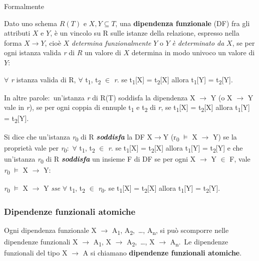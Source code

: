 \begin{center}
	Formalmente
\end{center}

\noindent Dato uno schema $R(T)$ e $X, Y \subseteq T$, una \textbf{dipendenza funzionale} (DF) fra gli attributi $X$ e $Y$, è un vincolo su R sulle istanze della relazione, espresso nella forma $X \rightarrow Y$, cioè $X$ \textit{determina funzionalmente} $Y$ o $Y$ \textit{è determinato da} $X$, se per ogni istanza valida \textit{r} di $R$ un valore di $X$ determina in modo univoco un valore di $Y$:\

\begin{center}
	$\forall$ \textit{r} istanza valida di R, $\forall$ t\textsubscript{1}, t\textsubscript{2} $\in$ \textit{r}. se t\textsubscript{1}[X] = t\textsubscript{2}[X] allora t\textsubscript{1}[Y] = t\textsubscript{2}[Y].\
\end{center}

\noindent In altre parole:\ un'istanza \textit{r} di R(T) soddisfa la dipendenza X $\rightarrow$ Y (o X $\rightarrow$ Y vale in \textit{r}), se per ogni coppia di ennuple t\textsubscript{1} e t\textsubscript{2} di \textit{r}, se t\textsubscript{1}[X] = t\textsubscript{2}[X] allora t\textsubscript{1}[Y] = t\textsubscript{2}[Y].

Si dice che un'istanza \textit{r}\textsubscript{0} di R \textbf{\textit{soddisfa}} la DF X$\rightarrow$Y (r\textsubscript{0} $\models$ X $\rightarrow$ Y) se la proprietà vale per \textit{r}\textsubscript{0}:\ $\forall$ t\textsubscript{1}, t\textsubscript{2} $\in$ \textit{r}. se t\textsubscript{1}[X] = t\textsubscript{2}[X] allora t\textsubscript{1}[Y] = t\textsubscript{2}[Y] e che un'istanza \textit{r}\textsubscript{0} di R \textbf{\textit{soddisfa}} un insieme F di DF se per ogni X $\rightarrow$ Y $\in$ F, vale \textit{r}\textsubscript{0} $\models$ X $\rightarrow$ Y:
\begin{center}
	\textit{r}\textsubscript{0} $\models$ X $\rightarrow$ Y \textit{sse} $\forall$ t\textsubscript{1}, t\textsubscript{2} $\in$ \textit{r}\textsubscript{0}. se t\textsubscript{1}[X] = t\textsubscript{2}[X] allora t\textsubscript{1}[Y] = t\textsubscript{2}[Y].
\end{center}

\subsubsection{Dipendenze funzionali atomiche}

Ogni dipendenza funzionale X $\rightarrow$ A\textsubscript{1}, A\textsubscript{2},\ \dots, A\textsubscript{n}, si può scomporre nelle dipendenze funzionali X $\rightarrow$ A\textsubscript{1}, X $\rightarrow$ A\textsubscript{2},\ \dots, X $\rightarrow$ A\textsubscript{n}.\
Le dipendenze funzionali del tipo X $\rightarrow$ A si chiamano \textbf{dipendenze funzionali atomiche}.

